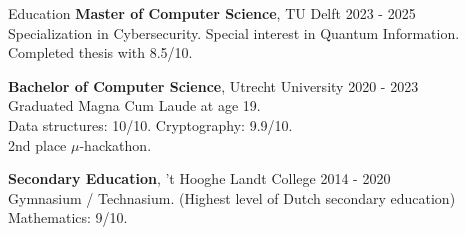 \documentclass{resume} %
\begin{document}

%
%
%

\begin{rSection}{Education}
{\bf Master of Computer Science}, TU Delft \hfill {2023 - 2025}\\
Specialization in Cybersecurity. Special interest in Quantum Information.\\
Completed thesis with 8.5/10.

{\bf Bachelor of Computer Science}, Utrecht University \hfill {2020 - 2023}\\
Graduated Magna Cum Laude at age 19.\\
Data structures: 10/10. Cryptography: 9.9/10.\\
2nd place $\mu$-hackathon.

{\bf Secondary Education}, 't Hooghe Landt College \hfill {2014 - 2020}\\
Gymnasium / Technasium. (Highest level of Dutch secondary education)\\
Mathematics: 9/10.


\end{rSection}
\end{document}

